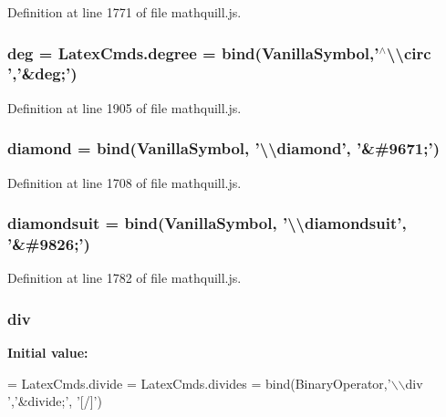 Definition at line 1771 of file mathquill.\-js.

\subsubsection[{deg}]{ deg = Latex\-Cmds.\-degree = {\bf bind}({\bf Vanilla\-Symbol},'$^\wedge$\textbackslash{}\textbackslash{}circ ','\&deg;')}\label{mathquill_8js_addf367cd024812410f6cf55a051a9e4a}


Definition at line 1905 of file mathquill.\-js.

\subsubsection[{diamond}]{ diamond = {\bf bind}({\bf Vanilla\-Symbol}, '\textbackslash{}\textbackslash{}diamond', '\&\#9671;')}\label{mathquill_8js_a7ed72fe699ebaf3d05540c0852e3dd19}


Definition at line 1708 of file mathquill.\-js.

\subsubsection[{diamondsuit}]{ diamondsuit = {\bf bind}({\bf Vanilla\-Symbol}, '\textbackslash{}\textbackslash{}diamondsuit', '\&\#9826;')}\label{mathquill_8js_abad01502513259285ec2e725e699cc37}


Definition at line 1782 of file mathquill.\-js.

\subsubsection[{div}]{ div}\label{mathquill_8js_a7faab0faa1bacc23a7ffe6f0c7c26e76}
{\bfseries Initial value\-:}
\begin{DoxyCode}
= LatexCmds.divide = LatexCmds.divides =
  bind(BinaryOperator,\textcolor{stringliteral}{'\(\backslash\)\(\backslash\)div '},\textcolor{stringliteral}{'&divide;'}, \textcolor{stringliteral}{'[/]'})
\end{DoxyCode}


